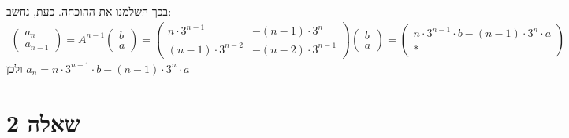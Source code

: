\documentclass{article}
\begin{document}
בכך השלמנו את ההוכחה. כעת, נחשב:
\begin{align*}
    \begin{pmatrix}
        a_{n} \\
        a_{n-1}
    \end{pmatrix}=A^{n-1}\begin{pmatrix}
                             b \\
                             a
                         \end{pmatrix}=
    \begin{pmatrix}
        n \cdot 3^{n-1}     & -(n-1) \cdot 3^{n}   \\
        (n-1) \cdot 3^{n-2} & -(n-2) \cdot 3^{n-1}
    \end{pmatrix}\begin{pmatrix}
                     b \\
                     a
                 \end{pmatrix}=
    \begin{pmatrix}
        n \cdot 3^{n-1}\cdot b - (n-1) \cdot 3^n\cdot  a \\
        \ast
    \end{pmatrix}
\end{align*}
ולכן $a_n=n \cdot 3^{n-1}\cdot b - (n-1) \cdot 3^n \cdot a$

\pagebreak

\section*{שאלה 2}
\end{document}
